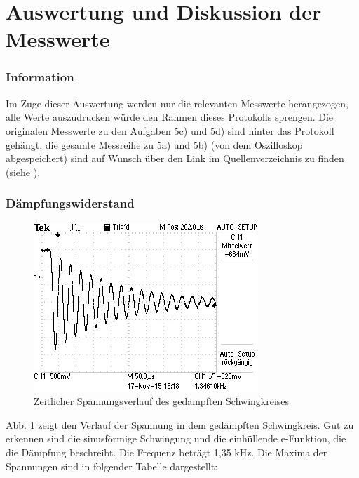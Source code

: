 \section{Auswertung und Diskussion der Messwerte}
\label{sec:Auswertung}
\subsubsection{Information}
Im Zuge dieser Auswertung werden nur die relevanten Messwerte herangezogen,
alle Werte auszudrucken würde den Rahmen dieses Protokolls sprengen.
Die originalen Messwerte zu den Aufgaben 5c) und 5d) sind hinter das Protokoll
gehängt, die gesamte Messreihe zu 5a) und 5b) (von dem Oszilloskop abgespeichert)
sind auf Wunsch über den Link im Quellenverzeichnis zu finden
(siehe \cite{messwerte}).
\subsubsection{Dämpfungswiderstand}
\begin{figure}
  \centering
  \includegraphics[width=\textwidth]{data/F0000TEK.jpg}
  \caption{Zeitlicher Spannungsverlauf des gedämpften Schwingkreises}
  \label{fig:5aergebnis}
\end{figure}
Abb. \ref{fig:5aergebnis} zeigt den Verlauf der Spannung in dem gedämpften
Schwingkreis. Gut zu erkennen sind die sinusförmige Schwingung und
die einhüllende e-Funktion, die die Dämpfung beschreibt.
Die Frequenz beträgt 1,35 kHz.
Die Maxima der Spannungen sind in folgender Tabelle dargestellt:
